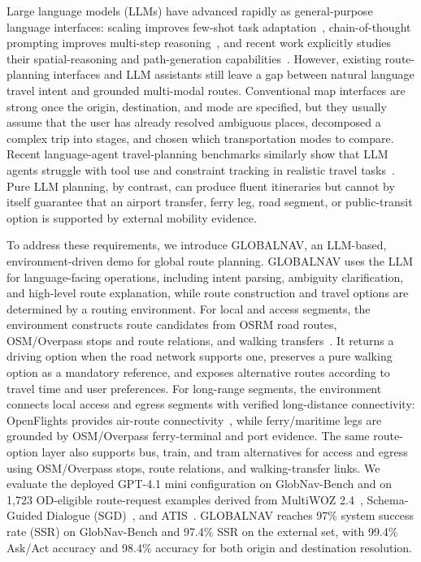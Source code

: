 \documentclass[11pt]{article}
\newcommand{\sys}{GLOBALNAV\xspace}
\newcommand{\bench}{GlobNav-Bench\xspace}
\begin{document}
Large language models (LLMs) have advanced rapidly as general-purpose language interfaces: scaling improves few-shot task adaptation~\citep{NEURIPS2020_1457c0d6}, chain-of-thought prompting improves multi-step reasoning~\citep{NEURIPS2022_9d560961}, and recent work explicitly studies their spatial-reasoning and path-generation capabilities~\citep{rizvi-etal-2024-sparc}. However, existing route-planning interfaces and LLM assistants still leave a gap between natural language travel intent and grounded multi-modal routes. Conventional map interfaces are strong once the origin, destination, and mode are specified, but they usually assume that the user has already resolved ambiguous places, decomposed a complex trip into stages, and chosen which transportation modes to compare. Recent language-agent travel-planning benchmarks similarly show that LLM agents struggle with tool use and constraint tracking in realistic travel tasks~\citep{pmlr-v235-xie24j}. Pure LLM planning, by contrast, can produce fluent itineraries but cannot by itself guarantee that an airport transfer, ferry leg, road segment, or public-transit option is supported by external mobility evidence.

To address these requirements, we introduce \sys, an LLM-based, environment-driven demo for global route planning. \sys uses the LLM for language-facing operations, including intent parsing, ambiguity clarification, and high-level route explanation, while route construction and travel options are determined by a routing environment. For local and access segments, the environment constructs route candidates from OSRM road routes, OSM/Overpass stops and route relations, and walking transfers~\citep{Haklay_2008,luxen-vetter-2011}. It returns a driving option when the road network supports one, preserves a pure walking option as a mandatory reference, and exposes alternative routes according to travel time and user preferences. For long-range segments, the environment connects local access and egress segments with verified long-distance connectivity: OpenFlights provides air-route connectivity~\citep{openflights_data_2026}, while ferry/maritime legs are grounded by OSM/Overpass ferry-terminal and port evidence. The same route-option layer also supports bus, train, and tram alternatives for access and egress using OSM/Overpass stops, route relations, and walking-transfer links. We evaluate the deployed GPT-4.1 mini configuration on \bench and on 1,723 OD-eligible route-request examples derived from MultiWOZ 2.4~\citep{ye-etal-2022-multiwoz}, Schema-Guided Dialogue (SGD)~\citep{rastogi-etal-2020-schema}, and ATIS~\citep{hemphill-etal-1990-atis}. \sys reaches 97\% system success rate (SSR) on \bench and 97.4\% SSR on the external set, with 99.4\% Ask/Act accuracy and 98.4\% accuracy for both origin and destination resolution.
\end{document}
